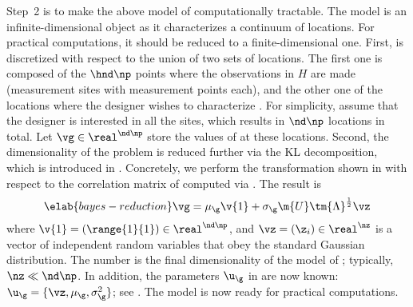 Step~2 is to make the above model of \g computationally tractable. The model is
an infinite-dimensional object as it characterizes a continuum of locations. For
practical computations, it should be reduced to a finite-dimensional one. First,
\g is discretized with respect to the union of two sets of locations. The first
one is composed of the $\hnd \np$ points where the observations in $H$ are made
(\hnd measurement sites with \np measurement points each), and the other one of
the locations where the designer wishes to characterize \g. For simplicity,
assume that the designer is interested in all the sites, which results in $\nd
\np$ locations in total. Let $\vg \in \real^{\nd \np}$ store the values of \g at
these locations. Second, the dimensionality of the problem is reduced further
via the \ac{KL} decomposition, which is introduced in
. Concretely, we perform the transformation
shown in  with respect to the correlation matrix of
\vg computed via . The result is
\begin{equation} \elab{bayes-reduction}
  \vg = \mu_\g \v{1} + \sigma_\g \m{U} \tm{\Lambda}^\frac{1}{2} \vz
\end{equation}
where $\v{1} = (\range{1}{1}) \in \real^{\nd \np}$, and $\vz = (\z_i) \in
\real^\nz$ is a vector of independent random variables that obey the standard
Gaussian distribution. The number \nz is the final dimensionality of the model
of \g; typically, $\nz \ll \nd \np$. In addition, the parameters $\u_\g$ in
 are now known: $\u_\g = \{ \vz, \mu_\g, \sigma^2_\g
\}$; see . The model is now ready for practical
computations.

